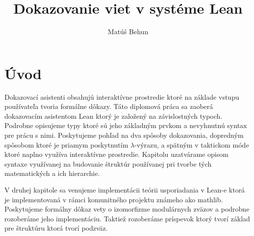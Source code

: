 \documentclass[a4paper,10pt,oneside]{report}%
\author{Mat\'u\v{s} Behun}
\title{Dokazovanie viet v systéme Lean}
\begin{document}






\tableofcontents

\newpage

\chapter{Úvod}
    Dokazovací asistenti obsahujú interaktívne prostredie ktoré na základe vstupu
používateľa tvoria formálne dôkazy.
    Táto diplomová práca sa zaoberá dokazovacím asistentom Lean ktorý je
založený na závislostných typoch.
    Podrobne opisujeme typy ktoré sú jeho základným prvkom a nevyhnutnú syntax pre
prácu s nimi.
    Poskytujeme pohľad na dva spôsoby dokazovania, dopredným spôsobom ktoré je priamym
poskytnutím $\lambda$-výrazu, a spätným v taktickom móde ktoré naplno využíva interaktívne
prostredie.
    Kapitolu uzatvárame opisom syntaxe využívanej na budovanie štruktúr používanej
pri tvorbe tých matematických a ich hierarchie.

    V druhej kapitole sa venujeme implementácii teórii usporiadania v Lean-e
ktorá je implementovaná v rámci komunitného projektu známeho ako mathlib.
    Poskytujeme formálny dôkaz vety o izomorfizme modulárnych zväzov a podrobne
rozoberáme jeho implementáciu.
Taktiež rozoberáme príspevok ktorý tvorí základ pre štruktúru ktorá tvorí podzväz.
\end{document}
